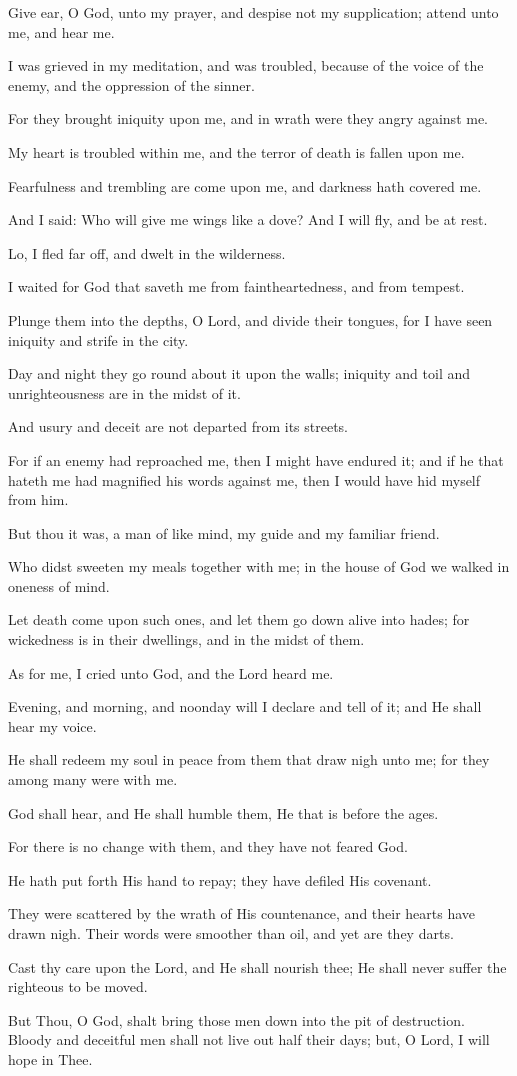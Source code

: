 Give ear, O God, unto my prayer, and despise not my supplication; attend unto me, and hear me.

I was grieved in my meditation, and was troubled, because of the voice of the enemy, and the oppression of the sinner.

For they brought iniquity upon me, and in wrath were they angry against me.

My heart is troubled within me, and the terror of death is fallen upon me.

Fearfulness and trembling are come upon me, and darkness hath covered me.

And I said: Who will give me wings like a dove? And I will fly, and be at rest.

Lo, I fled far off, and dwelt in the wilderness.

I waited for God that saveth me from faintheartedness, and from tempest.

Plunge them into the depths, O Lord, and divide their tongues, for I have seen iniquity and strife in the city.

Day and night they go round about it upon the walls; iniquity and toil and unrighteousness are in the midst of it.

And usury and deceit are not departed from its streets.

For if an enemy had reproached me, then I might have endured it; and if he that hateth me had magnified his words against me, then I would have hid myself from him.

But thou it was, a man of like mind, my guide and my familiar friend.

Who didst sweeten my meals together with me; in the house of God we walked in oneness of mind.

Let death come upon such ones, and let them go down alive into hades; for wickedness is in their dwellings, and in the midst of them.

As for me, I cried unto God, and the Lord heard me.

Evening, and morning, and noonday will I declare and tell of it; and He shall hear my voice.

He shall redeem my soul in peace from them that draw nigh unto me; for they among many were with me.

God shall hear, and He shall humble them, He that is before the ages.

For there is no change with them, and they have not feared God.

He hath put forth His hand to repay; they have defiled His covenant.

They were scattered by the wrath of His countenance, and their hearts have drawn nigh. Their words were smoother than oil, and yet are they darts.

Cast thy care upon the Lord, and He shall nourish thee; He shall never suffer the righteous to be moved.

But Thou, O God, shalt bring those men down into the pit of destruction. Bloody and deceitful men shall not live out half their days; but, O Lord, I will hope in Thee.
